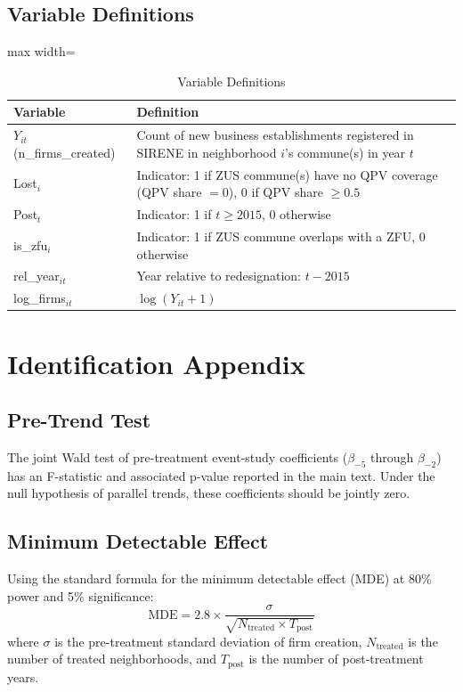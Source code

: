 \documentclass[12pt]{article}
\begin{document}
\subsection{Variable Definitions}

\begin{table}[H]
\centering
\caption{Variable Definitions}
\begin{adjustbox}{max width=\textwidth}
\begin{tabular}{lp{10cm}}
\toprule
Variable & Definition \\
\midrule
$Y_{it}$ (n\_firms\_created) & Count of new business establishments registered in SIRENE in neighborhood $i$'s commune(s) in year $t$ \\
Lost$_i$ & Indicator: 1 if ZUS commune(s) have no QPV coverage (QPV share $= 0$), 0 if QPV share $\geq 0.5$ \\
Post$_t$ & Indicator: 1 if $t \geq 2015$, 0 otherwise \\
is\_zfu$_i$ & Indicator: 1 if ZUS commune overlaps with a ZFU, 0 otherwise \\
rel\_year$_{it}$ & Year relative to redesignation: $t - 2015$ \\
log\_firms$_{it}$ & $\log(Y_{it} + 1)$ \\
\bottomrule
\end{tabular}
\end{adjustbox}
\end{table}


\section{Identification Appendix}

\subsection{Pre-Trend Test}

The joint Wald test of pre-treatment event-study coefficients ($\beta_{-5}$ through $\beta_{-2}$) has an F-statistic and associated p-value reported in the main text. Under the null hypothesis of parallel trends, these coefficients should be jointly zero.

\subsection{Minimum Detectable Effect}

Using the standard formula for the minimum detectable effect (MDE) at 80\% power and 5\% significance:
\begin{equation}
\text{MDE} = 2.8 \times \frac{\sigma}{\sqrt{N_{\text{treated}} \times T_{\text{post}}}}
\end{equation}
where $\sigma$ is the pre-treatment standard deviation of firm creation, $N_{\text{treated}}$ is the number of treated neighborhoods, and $T_{\text{post}}$ is the number of post-treatment years.
\end{document}
